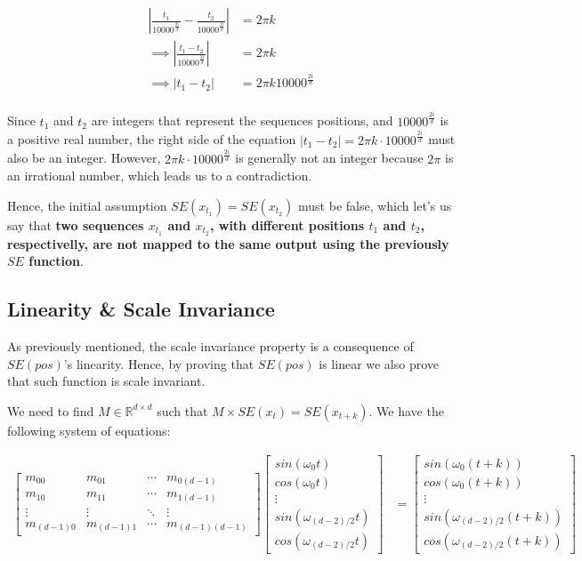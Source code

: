 \documentclass{article}
\begin{document}
\begin{align}
	| \frac{t_1}{10000^{\frac{2i}{d}}} - \frac{t_2}{10000^{\frac{2i}{d}}} | &=  2\pi k \\
	\implies 	| \frac{t_1 - t_2}{10000^{\frac{2i}{d}}} | &=  2\pi k \\
	\implies 	| t_1 - t_2 | &=  2\pi k 10000^{\frac{2i}{d}} \\
\end{align}


Since \( t_1 \) and \( t_2 \) are integers that represent the sequences positions, and \( 10000^{\frac{2i}{d}} \) is a positive real number, the right side of the equation \( \left| t_1 - t_2 \right| = 2\pi k \cdot 10000^{\frac{2i}{d}} \) must also be an integer. However, \( 2\pi k \cdot 10000^{\frac{2i}{d}} \) is generally not an integer because \( 2\pi \) is an irrational number, which leads us to a contradiction.

Hence, the initial assumption $SE(x_{t_1}) = SE(x_{t_2})$ must be false, which let's us say that \textbf{ two sequences $x_{t_1}$ and $x_{t_2}$, with different positions $t_1$ and $t_2$, respectivelly, are not mapped to the same output using the previously  $SE$ function}.


\subsection{Linearity \& Scale Invariance}

As previously mentioned, the scale invariance property is a consequence of $SE(pos)$'s linearity. Hence, by proving that $SE(pos)$ is linear we also prove that such function is scale invariant. 

We need to find $M \in \mathbb{R}^{d \times d}$ such that $M \times  SE(x_{t}) = SE(x_{t + k}) $. We have the following system of equations:

\begin{align}
	\begin{bmatrix}
		m_{00} & m_{01} & \cdots & m_{0(d-1)} \\
		m_{10} & m_{11} & \cdots & m_{1(d-1)} \\
		\vdots & \vdots & \ddots & \vdots \\
		m_{(d-1) 0} & m_{(d-1)1} & \cdots & m_{(d-1)(d-1)}
	\end{bmatrix}
	\begin{bmatrix}
		sin(\omega_0 t) \\
		cos(\omega_0 t) \\
		\vdots \\
		sin(\omega_{(d-2)/2} t) \\
		cos(\omega_{(d-2)/2} t) 
	\end{bmatrix}
	&=\begin{bmatrix}
		sin(\omega_0 (t+k)) \\
		cos(\omega_0 (t+k)) \\
		\vdots \\
		sin(\omega_{(d-2)/2}  (t+k)) \\
		cos(\omega_{(d-2)/2} (t+k)) 
	\end{bmatrix}
\end{align}
\end{document}
